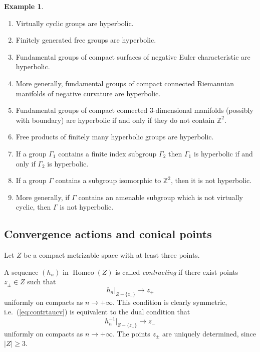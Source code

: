 \documentclass[12pt]{amsbook}%
\theoremstyle{definition}
\newtheorem{example}[thm]{Example}
\theoremstyle{remark}
\numberwithin{section}{chapter}
\numberwithin{subsection}{section}
\numberwithin{figure}{chapter}
\def\bZ{{\mathbb{Z}}}
\def\Ga{\Gamma}
\begin{document}
\begin{example}
\begin{enumerate}
\item Virtually cyclic groups are hyperbolic. 

\item Finitely generated free groups are hyperbolic. 

\item Fundamental groups of compact surfaces of negative Euler characteristic are hyperbolic. 

\item More generally, fundamental groups of compact connected Riemannian manifolds of negative curvature are hyperbolic. 

\item Fundamental groups of compact connected 3-dimensional manifolds (possibly with boundary) are hyperbolic if and only if they do not contain $\bZ^2$. 

\item Free products of finitely many hyperbolic groups are hyperbolic. 

\item If a group $\Ga_1$  contains a finite index subgroup $\Ga_2$ then $\Ga_1$ is hyperbolic if and only if $\Ga_2$ is hyperbolic. 

\item If a group $\Ga$ contains a subgroup isomorphic to $\bZ^2$, then it is not hyperbolic. 

\item More generally, if $\Ga$ contains an amenable subgroup which is not virtually cyclic, then $\Ga$ is not hyperbolic. 
\end{enumerate}
\end{example}




\subsection{Convergence actions and conical points}
\label{sec:convdy}

\def\Homeo{\operatorname{Homeo}}


Let $Z$ be a compact metrizable space with at least three points.

A sequence $(h_n)$ in $\Homeo(Z)$ is called {\em contracting}
if there exist points $z_{\pm}\in Z$ such that 
\begin{equation}
\label{eq:contrtaucv}
h_n|_{Z-\{z_-\}}\to z_+
\end{equation} 
uniformly on compacts as $n\to+\infty$.
This condition is clearly symmetric, i.e.\ (\ref{eq:contrtaucv})
is equivalent to the dual condition 
that
\begin{equation}
\label{eq:contrtaucvdual}
h^{-1}_n|_{Z-\{z_+\}}\to z_-
\end{equation} 
uniformly on compacts as $n\to+\infty$.
The points $z_{\pm}$ are uniquely determined, since $|Z|\geq3$.
\end{document}
